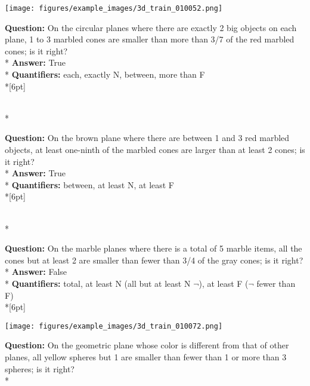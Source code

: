 \begin{figure*}
  \begin{minipage}{0.48\textwidth}
    \texttt{[image: figures/example\_images/3d\_train\_010052.png]}
    \begin{minipage}[t][2.2cm][t]{1\textwidth}
      \footnotesize
      \textbf{Question:} On the circular planes where there are exactly 2 big objects on each plane, 1 to 3 marbled cones are smaller than more than 3/7 of the red marbled cones; is it right? \\*
      \textbf{Answer:}  True \\*
      \textbf{Quantifiers:} each, exactly N, between, more than F \\*[6pt]
    \end{minipage}\\*
    \begin{minipage}[t][2.2cm][t]{1\textwidth}
      \footnotesize
      \textbf{Question:} On the brown plane where there are between 1 and 3 red marbled objects, at least one-ninth of the marbled cones are larger than at least 2 cones; is it right? \\*
      \textbf{Answer:} True \\*
      \textbf{Quantifiers:} between, at least N, at least F \\*[6pt]
    \end{minipage}\\*
    \begin{minipage}[t][2.2cm][t]{1\textwidth}
      \footnotesize
      \textbf{Question:} On the marble planes where there is a total of 5 marble items, all the cones but at least 2 are smaller than fewer than 3/4 of the gray cones; is it right? \\*
      \textbf{Answer:} False \\*
      \textbf{Quantifiers:} total, at least N (all but at least N $\neg$), at least F ($\neg$ fewer than F)\\*[6pt]
    \end{minipage}
  \end{minipage}
  \hspace{3.5mm}
  \begin{minipage}{0.48\textwidth}
    \texttt{[image: figures/example\_images/3d\_train\_010072.png]}
    \begin{minipage}[t][2.2cm][t]{1\textwidth}
      \footnotesize
      \textbf{Question:} On the geometric plane whose color is different from that of other planes, all yellow spheres but 1 are smaller than fewer than 1 or more than 3 spheres; is it right? \\*

\end{minipage}
\end{minipage}
\end{figure*}
